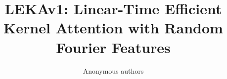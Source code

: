 \title{\textbf{LEKAv1: Linear-Time Efficient Kernel Attention with Random Fourier Features}}

\author{Anonymous authors}
